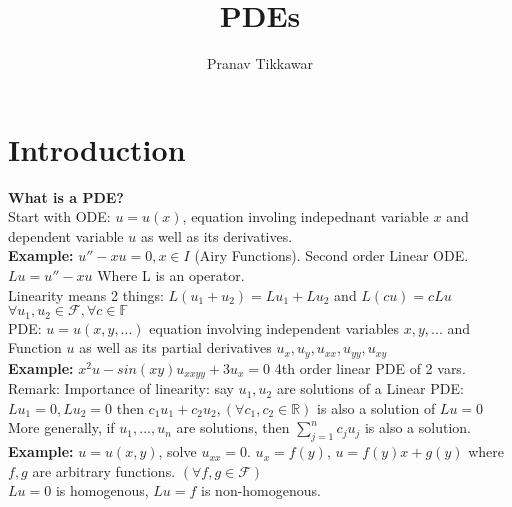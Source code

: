 \documentclass{article}
\author{Pranav Tikkawar}
\title{PDEs}
\begin{document}
\maketitle

\section*{Introduction}
\textbf{What is a PDE?}\\
Start with ODE: $u = u(x)$, equation involing indepednant variable $x$ and dependent variable $u$ as well as its derivatives.\\
\textbf{Example:} $u'' -x u = 0, x \in I$ (Airy Functions). Second order Linear ODE. $Lu = u'' - xu$ Where L is an operator.\\
Linearity means 2 things: $L(u_1 + u_2) = Lu_1 + Lu_2$ and $L(cu) = cLu$\\ $\forall u_1, u_2 \in \mathcal{F}, \forall c \in \mathds{F}$\\
PDE: $u = u(x, y, ...)$ equation involving independent variables $x, y, ...$ and Function $u$ as well as its partial derivatives $u_x, u_y, u_{xx}, u_{yy}, u_{xy}$\\
\textbf{Example:} $x^2u - sin(xy)u_{xxyy}+3u_x = 0$ 4th order linear PDE of 2 vars.\\
Remark: Importance of linearity: say $u_1, u_2$ are solutions of a Linear PDE: $Lu_1 = 0, Lu_2 = 0$ then $c_1u_1 + c_2u_2, (\forall c_1, c_2 \in \mathds{R})$  is also a solution of $Lu = 0$\\
More generally, if $u_1, ..., u_n$ are solutions, then $\sum_{j=1}^{n}c_ju_j$ is also a solution.\\ 
\textbf{Example:} $u=u(x,y)$, solve $u_{xx} = 0$. $u_x = f(y)$, $u = f(y)x + g(y)$ where $f,g$ are arbitrary functions. $(\forall f,g \in \mathcal{F})$\\
$Lu = 0$  is homogenous, $Lu = f$ is non-homogenous.\\
\end{document}

